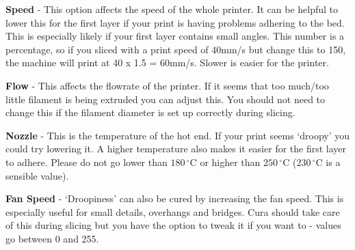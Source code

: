 \documentclass[a4paper,12pt]{article}
\begin{document}
\vspace*{2mm}
\small{
\noindent \textbf{Speed} - This option affects the speed of the whole printer. It can be helpful to lower this for the first layer if your print is having problems adhering to the bed. This is 
especially likely if your first layer contains small angles. This number is a percentage, so if you sliced with a print speed of 40mm/s but change this to 150, the machine will print at 40 x 1.5 = 60mm/s.
Slower is easier for the printer.

\vspace*{2mm}
\noindent \textbf{Flow} - This affects the flowrate of the printer. If it seems that too much/too little filament is being extruded you can adjust this. 
You should not need to change this if the filament diameter is set up correctly during slicing.

\vspace*{2mm}
\noindent \textbf{Nozzle} - This is the temperature of the hot end. If your print seems `droopy' you could try lowering it. A higher temperature 
also makes it easier for the first layer to adhere. Please do not go lower than $180\,^{\circ}$C or higher than $250\,^{\circ}$C ($230\,^{\circ}$C is a sensible value).

\vspace*{2mm}
\noindent \textbf{Fan Speed} - `Droopiness' can also be cured by increasing the fan speed. This is especially useful for small details, overhangs and bridges. Cura
should take care of this during slicing but you have the option to tweak it if you want to - values go between 0 and 255.
}
\end{document}
